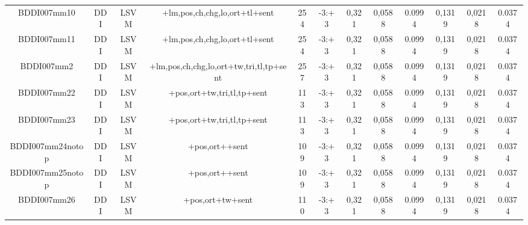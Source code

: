\documentclass[a4paper]{article}
\begin{document}
\begin{landscape}
\begin{center}
\begin{tabular}{ |c|c|c|c|c|c|c|c|c|c|c|c|}
 	
 
 	
 		
 		\small{ BDDI007mm10 } & DDI & LSVM & +lm,pos,ch,chg,lo,ort+tl+sent  &  254 &  -3:+3  &  0,321 & 0,0588 & 0.0994  &  0,1319 & 0,0218 & 0.0374 \\
 		

 	
 
 	
 		
 		\small{ BDDI007mm11 } & DDI & LSVM & +lm,pos,ch,chg,lo,ort+tl+sent  &  254 &  -3:+3  &  0,321 & 0,0588 & 0.0994  &  0,1319 & 0,0218 & 0.0374 \\
 		

 	
 
 	
 		
 		\small{ BDDI007mm2 } & DDI & LSVM & +lm,pos,ch,chg,lo,ort+tw,tri,tl,tp+sent  &  257 &  -3:+3  &  0,321 & 0,0588 & 0.0994  &  0,1319 & 0,0218 & 0.0374 \\
 		

 	
 
 	
 		
 		\small{ BDDI007mm22 } & DDI & LSVM & +pos,ort+tw,tri,tl,tp+sent  &  113 &  -3:+3  &  0,321 & 0,0588 & 0.0994  &  0,1319 & 0,0218 & 0.0374 \\
 		

 	
 
 	
 		
 		\small{ BDDI007mm23 } & DDI & LSVM & +pos,ort+tw,tri,tl,tp+sent  &  113 &  -3:+3  &  0,321 & 0,0588 & 0.0994  &  0,1319 & 0,0218 & 0.0374 \\
 		

 	
 
 	
 		
 		\small{ BDDI007mm24notop } & DDI & LSVM & +pos,ort++sent  &  109 &  -3:+3  &  0,321 & 0,0588 & 0.0994  &  0,1319 & 0,0218 & 0.0374 \\
 		

 	
 
 	
 		
 		\small{ BDDI007mm25notop } & DDI & LSVM & +pos,ort++sent  &  109 &  -3:+3  &  0,321 & 0,0588 & 0.0994  &  0,1319 & 0,0218 & 0.0374 \\
 		

 	
 
 	
 		
 		\small{ BDDI007mm26 } & DDI & LSVM & +pos,ort+tw+sent  &  110 &  -3:+3  &  0,321 & 0,0588 & 0.0994  &  0,1319 & 0,0218 & 0.0374 \\
 		

 	
 

\end{tabular}
\end{center}
\end{landscape}
\end{document}
